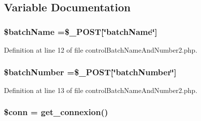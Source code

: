 \subsection{Variable Documentation}
\hypertarget{control_batch_name_and_number2_8php_ae0139f42f02473374ecb453f87c66534}{
\subsubsection[{\$batch\-Name}]{\setlength{\rightskip}{0pt plus 5cm}\${\bf batch\-Name} =\$\-\_\-\-P\-O\-S\-T\mbox{[}\char`\"{}batch\-Name\char`\"{}\mbox{]}}}\label{control_batch_name_and_number2_8php_ae0139f42f02473374ecb453f87c66534}


Definition at line 12 of file control\-Batch\-Name\-And\-Number2.\-php.

\hypertarget{control_batch_name_and_number2_8php_a5efc7692d3e718869a2ba3a55876129c}{
\subsubsection[{\$batch\-Number}]{\setlength{\rightskip}{0pt plus 5cm}\$batch\-Number =\$\-\_\-\-P\-O\-S\-T\mbox{[}\char`\"{}batch\-Number\char`\"{}\mbox{]}}}\label{control_batch_name_and_number2_8php_a5efc7692d3e718869a2ba3a55876129c}


Definition at line 13 of file control\-Batch\-Name\-And\-Number2.\-php.

\hypertarget{control_batch_name_and_number2_8php_aa8a5a87b9c1a6a0819b88447cbe41877}{
\subsubsection[{\$conn}]{\setlength{\rightskip}{0pt plus 5cm}\$conn = {\bf get\-\_\-connexion}()}}\label{control_batch_name_and_number2_8php_aa8a5a87b9c1a6a0819b88447cbe41877}


